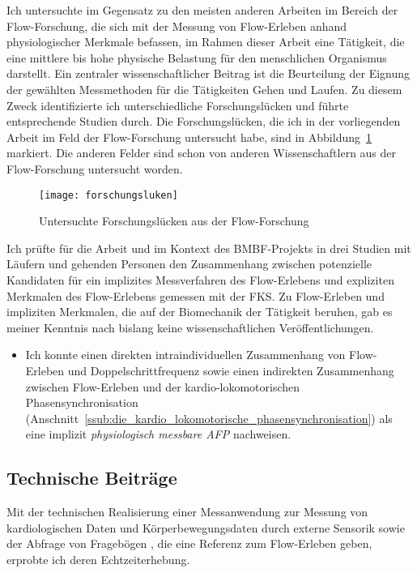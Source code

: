 Ich untersuchte im Gegensatz zu den meisten anderen Arbeiten im Bereich der Flow-Forschung, die sich mit der Messung von Flow-Erleben anhand physiologischer Merkmale befassen, im Rahmen dieser Arbeit eine Tätigkeit, die eine mittlere bis hohe physische Belastung für den menschlichen Organismus darstellt. Ein zentraler wissenschaftlicher Beitrag ist die Beurteilung der Eignung der gewählten Messmethoden für die Tätigkeiten Gehen und Laufen. Zu diesem Zweck identifizierte ich unterschiedliche Forschungslücken und führte entsprechende Studien durch. Die Forschungslücken, die ich in der vorliegenden Arbeit im Feld der Flow-Forschung untersucht habe, sind in Abbildung~\ref{fig:forschungsluken} markiert. Die anderen Felder sind schon von anderen Wissenschaftlern aus der Flow-Forschung untersucht worden. 
\begin{figure}
	[!htb] \centering 
	\texttt{[image: forschungsluken]} \caption[Untersuchte Forschungslücken aus der Flow-Forschung]{Untersuchte Forschungslücken aus der Flow-Forschung} \label{fig:forschungsluken} 
\end{figure}

Ich prüfte für die Arbeit und im Kontext des \acs{BMBF}-Projekts in drei Studien mit Läufern und gehenden Personen den Zusammenhang zwischen potenzielle Kandidaten für ein implizites Messverfahren des Flow-Erlebens und expliziten Merkmalen des Flow-Erlebens gemessen mit der \ac{FKS}. Zu Flow-Erleben und impliziten Merkmalen, die auf der Biomechanik der Tätigkeit beruhen, gab es meiner Kenntnis nach bislang keine wissenschaftlichen Veröffentlichungen. 
\begin{itemize}
	
	\item Ich konnte einen direkten intraindividuellen Zusammenhang von Flow-Erleben und Doppelschrittfrequenz sowie einen indirekten Zusammenhang zwischen Flow-Erleben und der kardio-lokomotorischen Phasensynchronisation (Anschnitt~\ref{ssub:die_kardio_lokomotorische_phasensynchronisation}) als eine implizit \emph{physiologisch messbare \ac{AFP}} nachweisen. 
\end{itemize}

\subsection{Technische Beiträge} 

\label{sub:technische_beitrage}

Mit der technischen Realisierung einer Messanwendung zur Messung von kardiologischen Daten und Körperbewegungsdaten durch externe Sensorik sowie der Abfrage von Fragebögen \citep{Bogutzky2016}, die eine Referenz zum Flow-Erleben geben, erprobte ich deren Echtzeiterhebung. 

